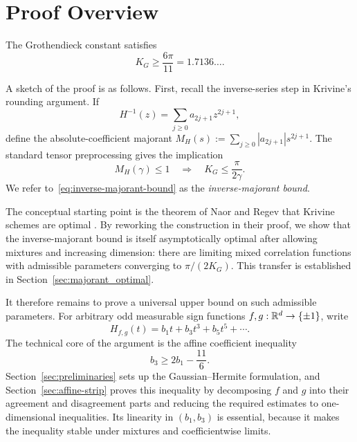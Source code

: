 \section{Proof Overview}
\label{sec:proof-idea}


\begin{theorem}\label{thm:lower-bound}
The Grothendieck constant satisfies
\[
        K_G\ge\frac{6\pi}{11} = 1.7136\ldots.
\]
\end{theorem}

A sketch of the proof is as follows. First, recall the inverse-series step in Krivine's rounding argument. If
\[
        H^{-1}(z)=\sum_{j\ge0}a_{2j+1}z^{2j+1},
\]
define the absolute-coefficient majorant $M_H(s):=\sum_{j\ge0}|a_{2j+1}|s^{2j+1}$. The standard tensor preprocessing gives the implication
\begin{equation}
        M_H(\gamma)\le1
        \quad\Longrightarrow\quad
        K_G\le\frac{\pi}{2\gamma}.
        \label{eq:inverse-majorant-bound}
\end{equation}
We refer to~\eqref{eq:inverse-majorant-bound} as the \emph{inverse-majorant bound}.

The conceptual starting point is the theorem of Naor and Regev that Krivine schemes are optimal \cite{naor2014krivine}. By reworking the construction in their proof, we show that the inverse-majorant bound is itself asymptotically optimal after allowing mixtures and increasing dimension: there are limiting mixed correlation functions with admissible parameters converging to $\pi/(2K_G)$. This transfer is established in Section~\ref{sec:majorant_optimal}.

It therefore remains to prove a universal upper bound on such admissible parameters. For arbitrary odd measurable sign functions $f,g:\mathbb{R}^d\to\{\pm1\}$, write
\[
        H_{f,g}(t)=b_1t+b_3t^3+b_5t^5+\cdots.
\]
The technical core of the argument is the affine coefficient inequality
\[
        b_3\ge 2b_1-\frac{11}{6}.
\]
Section~\ref{sec:preliminaries} sets up the Gaussian--Hermite formulation, and Section~\ref{sec:affine-strip} proves this inequality by decomposing $f$ and $g$ into their agreement and disagreement parts and reducing the required estimates to one-dimensional inequalities. Its linearity in $(b_1,b_3)$ is essential, because it makes the inequality stable under mixtures and coefficientwise limits.

